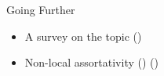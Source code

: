 \documentclass[a4paper,11pt]{book}
\begin{document}
\begin{textbox}{Going Further}
\begin{itemize}
    \item A survey on the topic (\cite{noldus2015assortativity})
    \item Non-local assortativity (\cite{peel2018multiscale}) (\cite{rossetti2021conformity})
\end{itemize}

\end{textbox}





\end{document}
